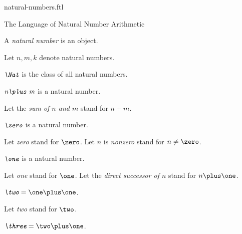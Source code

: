 \documentclass{naproche-library}
\begin{document}
\begin{smodule}[title=Natural Numbers]{natural-numbers.ftl}

\begin{sfragment}{The Language of Natural Number Arithmetic}
  \begin{signature}[forthel,id=NatNumberSig]
    A \emph{natural number} is an object.

    Let $n,m,k$ denote natural numbers.
  \end{signature}

  \begin{definition}[forthel,id=NatDef]
    $\emph{\Nat}$ is the class of all natural numbers.
  \end{definition}

  \begin{signature}[forthel,id=PlusSig]
    $\emph{n\plus m}$ is a natural number.

    Let the \emph{sum of $n$ and $m$} stand for $n\plus m$.
  \end{signature}

  \begin{signature}[forthel,id=ZeroSig]
    $\emph{\zero}$ is a natural number.

    Let \emph{zero} stand for $\zero$.
    Let $n$ is \emph{nonzero} stand for $n\neq\zero$.
  \end{signature}

  \begin{signature}[forthel,id=OneSig]
    $\emph{\one}$ is a natural number.

    Let \emph{one} stand for $\one$.
    Let the \emph{direct successor of $n$} stand for $n\plus\one$.
  \end{signature}

  \begin{definition}[forthel,id=TwoSig]
    $\emph{\two}=\one\plus\one$.

    Let \emph{two} stand for $\two$.
  \end{definition}

  \begin{definition}[forthel,id=ThreeSig]
    $\emph{\three}=\two\plus\one$.


\end{definition}
\end{sfragment}
\end{smodule}
\end{document}
